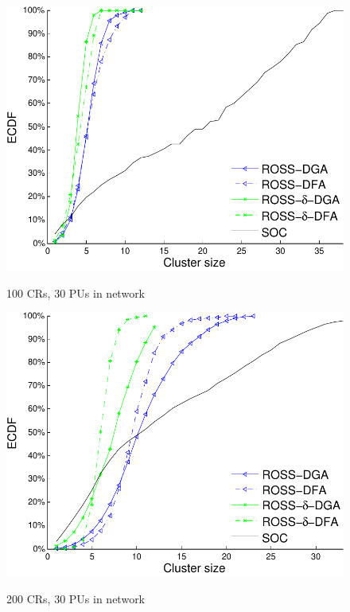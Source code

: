 \documentclass[times]{ettauth}
\theoremstyle{mytheoremstyle}
\theoremstyle{mytheoremstyle}
\theoremstyle{mytheoremstyle}
\begin{document}
\begin{figure}[t]
\begin{multicols}{3}
    \includegraphics[width=\linewidth]{cdf_clusterSize_100.pdf}\par\caption{100 CRs, 30 PUs in network}\label{cdf_clusterSize_100}
    \includegraphics[width=\linewidth]{cdf_clusterSize_200.pdf}\par\caption{200 CRs, 30 PUs in network}\label{cdf_clusterSize_200}

\end{multicols}
\end{figure}
\end{document}
